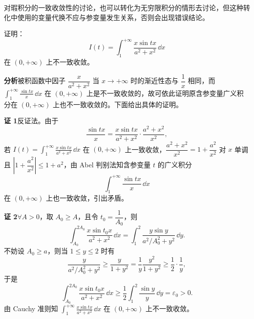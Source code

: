 \begin{xremark}
对瑕积分的一致收敛性的讨论，也可以转化为无穷限积分的情形去讨论，但这种转化中使用的变量代换不应与参变量发生关系，否则会出现错误结论。
\end{xremark}

\begin{xexample}[23.2.4]
证明：
\[
  I(t)=\int_1^{+\infty}\frac{x\sin tx}{a^2+x^2}\,\dd x
\]
在 $(0,+\infty)$ 上不一致收敛。
\end{xexample}

\textbf{分析}\quad 被积函数中因子 $\dfrac{x}{a^2+x^2}$ 当 $x\to+\infty$ 时的渐近性态与 $\dfrac1x$ 相同，而 $\displaystyle\int_1^{+\infty}\frac{\sin tx}{x}\,\dd x$ 在 $(0,+\infty)$ 上是不一致收敛的，故可依此证明原含参变量广义积分在 $(0,+\infty)$ 上也不一致收敛的。下面给出具体的证明。

\textbf{证 1}\quad 反证法。由于
\[
  \frac{\sin tx}{x}=\frac{x\sin tx}{a^2+x^2}\cdot\frac{a^2+x^2}{x^2},
\]
若 $I(t)=\displaystyle\int_1^{+\infty}\frac{x\sin tx}{a^2+x^2}\,\dd x$ 在 $(0,+\infty)$ 上一致收敛，$\dfrac{a^2+x^2}{x^2}=1+\dfrac{a^2}{x^2}$ 对 $x$ 单调且 $\left|1+\dfrac{a^2}{x^2}\right|\leqslant1+a^2$，由 Abel 判别法知含参变量 $t$ 的广义积分
\[
  \int_1^{+\infty}\frac{\sin tx}{x}\,\dd x
\]
在 $(0,+\infty)$ 上也一致收敛，引出矛盾。

\textbf{证 2}\quad $\forall A>0$，取 $A_0\geqslant A$，且令 $t_0=\dfrac1{A_0}$，则
\[
  \int_{A_0}^{2A_0}\frac{x\sin t_0x}{a^2+x^2}\,\dd x
  =\int_1^2\frac{y\sin y}{a^2/A_0^2+y^2}\,\dd y.
\]
不妨设 $A_0\geqslant a$，则当 $1\leqslant y\leqslant2$ 时有
\[
  \frac{y}{a^2/A_0^2+y^2}\geqslant\frac{y}{1+y^2}=\frac1y\frac{y^2}{1+y^2}\geqslant\frac12\cdot\frac1y,
\]
于是
\[
  \int_{A_0}^{2A_0}\frac{x\sin t_0x}{a^2+x^2}\,\dd x
  \geqslant\frac12\int_1^2\frac{\sin y}{y}\,\dd y=\varepsilon_0>0.
\]
由 Cauchy 准则知 $\displaystyle\int_1^{+\infty}\frac{x\sin tx}{a^2+x^2}\,\dd x$ 在 $(0,+\infty)$ 上不一致收敛。

